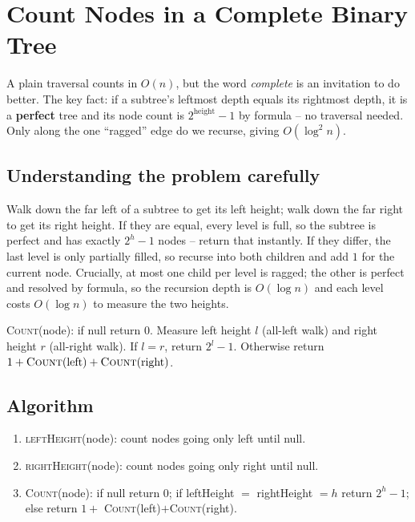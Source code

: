 \section{Count Nodes in a Complete Binary Tree}
\label{sec:trees-count-complete}


\begin{patternbox}
A plain traversal counts in $O(n)$, but the word \emph{complete} is an
invitation to do better. The key fact: if a subtree's leftmost depth equals
its rightmost depth, it is a \textbf{perfect} tree and its node count is
$2^{\text{height}}-1$ by formula -- no traversal needed. Only along the
one ``ragged'' edge do we recurse, giving $O(\log^2 n)$.
\end{patternbox}

\subsection*{Understanding the problem carefully}

Walk down the far left of a subtree to get its left height; walk down the
far right to get its right height. If they are equal, every level is full,
so the subtree is perfect and has exactly $2^h-1$ nodes -- return that
instantly. If they differ, the last level is only partially filled, so
recurse into both children and add $1$ for the current node. Crucially, at
most one child per level is ragged; the other is perfect and resolved by
formula, so the recursion depth is $O(\log n)$ and each level costs
$O(\log n)$ to measure the two heights.

\begin{ideabox}
\textsc{Count}(node): if null return $0$. Measure left height $l$
(all-left walk) and right height $r$ (all-right walk). If $l=r$, return
$2^{l}-1$. Otherwise return $1 + \textsc{Count}(\text{left}) +
\textsc{Count}(\text{right})$.
\end{ideabox}

\subsection*{Algorithm}

\begin{enumerate}
  \item \textsc{leftHeight}(node): count nodes going only left until null.
  \item \textsc{rightHeight}(node): count nodes going only right until
        null.
  \item \textsc{Count}(node): if null return $0$; if leftHeight $=$
        rightHeight $=h$ return $2^h-1$; else return $1+$
        \textsc{Count}(left)$+$\textsc{Count}(right).
\end{enumerate}


